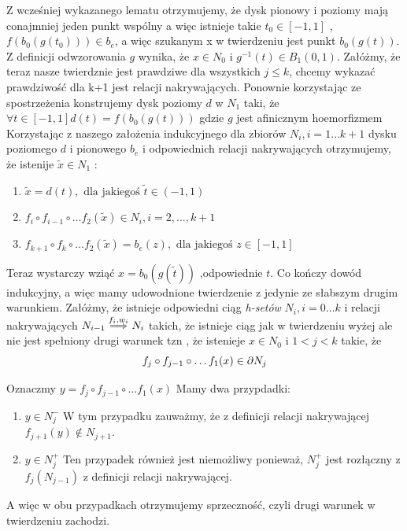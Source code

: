 Z wcześniej wykazanego lematu otrzymujemy, że dysk pionowy i poziomy mają conajmniej jeden punkt wspólny 
a więc istnieje takie $ t_0 \in [-1,1] $ , $ f(b_0(g(t_0))) \in b_e $, a więc szukanym 
x w twierdzeniu jest punkt $b_0(g(t)) $. Z definicji odwzorowania $ g $ wynika, że $ x \in N_0 $ i 
$ g^{-1}(t) \in B_1(0,1) $.
Załóżmy, że teraz nasze twierdznie jest prawdziwe dla wszystkich $ j \leq k $, chcemy wykazać 
prawdziwość dla k+1 jest relacji nakrywających.
Ponownie korzystając ze spostrzeżenia konstrujemy dysk poziomy $ d $ w $ N_1 $ taki, że
$ \forall t \in [-1,1] d(t) = f(b_0(g(t))) $
gdzie $ g $ jest afinicznym hoemorfizmem
Korzystając z naszego założenia indukcyjnego dla zbiorów $ N_i , i = 1 \dots k+1 $ 
dysku poziomego $ d $ i pionowego $b_e$ i odpowiednich relacji nakrywających otrzymujemy, że 
istenije $ \tilde{x} \in N_1$ :
\begin{enumerate}
 \item $ \tilde{x} = d(t) , \mbox{ dla jakiegoś } \tilde{t} \in (-1,1) $
 \item $ f_i \circ f_{i-1} \circ \dots f_2(\tilde{x}) \in N_i , i = 2,...,k+1$
 \item $ f_{k+1} \circ f_{k} \circ \dots f_2(\tilde{x}) = b_e(z) , \mbox{ dla jakiegoś } z \in [-1,1]$
\end{enumerate}

Teraz wystarczy wziąć $ x = b_0(g(\tilde{t})) $ ,odpowiednie $ t $. Co kończy 
dowód indukcyjny, a więc mamy udowodnione twierdzenie z jedynie ze słabszym drugim warunkiem.
Załóżmy, że istnieje odpowiedni ciąg {\em h-setów } $ N_i , i = 0 \dots k $ i relacji nakrywających
$ N_{i-1} \stackrel{f_i,w_i}{\Longrightarrow} N_{i} $ takich, że istnieje ciąg jak w twierdzeniu wyżej ale 
nie jest spełniony drugi warunek tzn , że istenieje $ x \in N_0 $ i $ 1 < j < k $ takie, że
$$
     f_j \circ f_{j-1} \circ \dots f_1(x) \in \partial N_j 
$$

Oznaczmy $ y = f_j \circ f_{j-1} \circ \dots f_1(x) $
Mamy dwa przypdadki:
\begin{enumerate}
 \item $ y \in N^{-}_j $ \newline
  W tym przypadku zauważmy, że z definicji relacji nakrywającej $ f_{j+1}(y) \notin N_{j+1} $.
 \item $ y \in N^{+}_j $
  Ten przypadek również jest niemożliwy ponieważ, $ N^{+}_j $ jest rozłączny z $ f_j(N_{j-1}) $ z definicji
  relacji nakrywającej.
\end{enumerate} 
A więc w obu przypadkach otrzymujemy sprzeczność, czyli drugi warunek w twierdzeniu zachodzi.


